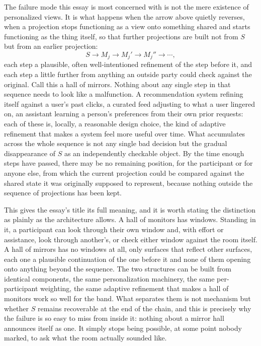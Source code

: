 \documentclass[12pt]{article}
\begin{document}
The failure mode this essay is most concerned with is not the mere existence of personalized views. It is what happens when the arrow above quietly reverses, when a projection stops functioning as a view onto something shared and starts functioning as the thing itself, so that further projections are built not from $S$ but from an earlier projection:
\[
S \rightarrow M_j \rightarrow M_j' \rightarrow M_j'' \rightarrow \cdots,
\]
each step a plausible, often well-intentioned refinement of the step before it, and each step a little further from anything an outside party could check against the original. Call this a hall of mirrors. Nothing about any single step in that sequence needs to look like a malfunction. A recommendation system refining itself against a user's past clicks, a curated feed adjusting to what a user lingered on, an assistant learning a person's preferences from their own prior requests: each of these is, locally, a reasonable design choice, the kind of adaptive refinement that makes a system feel more useful over time. What accumulates across the whole sequence is not any single bad decision but the gradual disappearance of $S$ as an independently checkable object. By the time enough steps have passed, there may be no remaining position, for the participant or for anyone else, from which the current projection could be compared against the shared state it was originally supposed to represent, because nothing outside the sequence of projections has been kept.

This gives the essay's title its full meaning, and it is worth stating the distinction as plainly as the architecture allows. A hall of monitors has windows. Standing in it, a participant can look through their own window and, with effort or assistance, look through another's, or check either window against the room itself. A hall of mirrors has no windows at all, only surfaces that reflect other surfaces, each one a plausible continuation of the one before it and none of them opening onto anything beyond the sequence. The two structures can be built from identical components, the same personalization machinery, the same per-participant weighting, the same adaptive refinement that makes a hall of monitors work so well for the band. What separates them is not mechanism but whether $S$ remains recoverable at the end of the chain, and this is precisely why the failure is so easy to miss from inside it: nothing about a mirror hall announces itself as one. It simply stops being possible, at some point nobody marked, to ask what the room actually sounded like.
\end{document}
